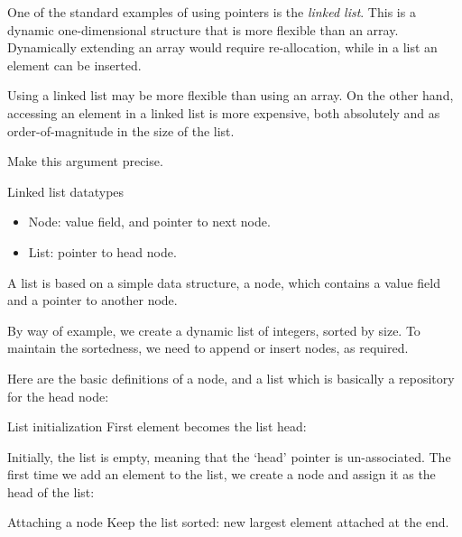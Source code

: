 One of the standard examples of using pointers is the
\emph{linked list}. This is a dynamic one-dimensional structure
that is more flexible than an array. Dynamically extending an array
would require re-allocation, while in a list an element can be
inserted.

\begin{exercise}
  Using a linked list may be more flexible than using an array.
  On the other hand, accessing an element in a linked list is
  more expensive, both absolutely and as order-of-magnitude in the size
  of the list.

  Make this argument precise.
\end{exercise}

\begin{block}{Linked list datatypes}
  \label{sl:flink2}
  \begin{itemize}
  \item Node: value field, and pointer to next node.
  \item List: pointer to head node.
  \end{itemize}
\end{block}

A list is based on a simple data structure, a node, which contains a
value field and a pointer to another node.

By way of example, we create a dynamic list of integers, sorted by
size. To maintain the sortedness, we need to append or insert nodes,
as required.

Here are the basic definitions of a node, and a list which is
basically a repository for the head node:
%

\begin{block}{List initialization}
  \label{sl:flink3}
  First element becomes the list head:

  
\end{block}

Initially, the list is empty, meaning that the `head' pointer is
un-associated. The first time we add an element to the list, we create
a node and assign it as the head of the list:
%

\begin{block}{Attaching a node}
  \label{sl:flink4}
  Keep the list sorted: new largest element attached at the end.
  
\end{block}

